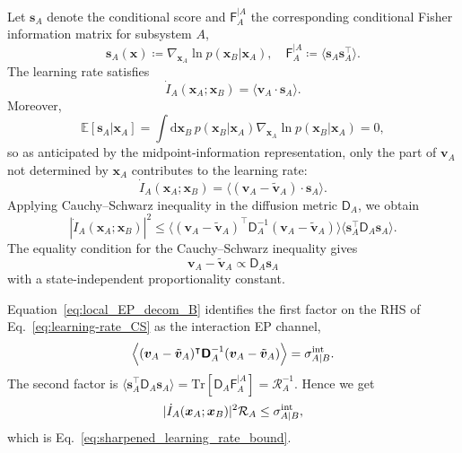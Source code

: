 \documentclass[
 longbibliography,
 twocolumn,
 superscriptaddress,
 amsmath,
 amssymb,
 amsthm,
 amsfonts,
 prl,
 floatfix,
]{revtex4-2}
\newcommand{\matbf}[1]{\boldsymbol{\mathsf{#1}}}
\begin{document}
Let $\bm s_A$ denote the conditional score and $\matbf F_A^{|A}$ the corresponding conditional Fisher information matrix for subsystem $A$,
\begin{equation*}
    \bm s_A(\bm x)\coloneq\nabla_{\bm x_A}\ln p(\bm x_B|\bm x_A),
    \quad
    \matbf F_A^{|A}\coloneq\langle\bm s_A\bm s_A^\intercal\rangle.
\end{equation*}
The learning rate satisfies~\cite{horowitz2014thermodynamics}
\begin{equation*}
    \dot I_A(\bm x_A;\bm x_B)=\langle\bm v_A\cdot\bm s_A\rangle.
\end{equation*}
Moreover,
\begin{equation*}
    \mathbb E[\bm s_A|\bm x_A]=\int\mathrm d\bm x_B\,p(\bm x_B|\bm x_A)\nabla_{\bm x_A}\ln p(\bm x_B|\bm x_A)=0,
\end{equation*}
so as anticipated by the midpoint-information representation, only the part of $\bm v_A$ not determined by $\bm x_A$ contributes to the learning rate:
\[
    \dot I_A(\bm x_A;\bm x_B)
    =\big\langle(\bm v_A-\tilde{\bm v}_A)\cdot\bm s_A\big\rangle.
\]
Applying Cauchy--Schwarz inequality in the diffusion metric $\matbf D_A$, we obtain
\begin{equation}
   \left|\dot I_A(\bm x_A;\bm x_B)\right|^2\leq
    \Big\langle(\bm v_A-\tilde{\bm v}_A)^\intercal\matbf D_A^{-1}(\bm v_A-\tilde{\bm v}_A)\Big\rangle
    \Big\langle\bm s_A^\intercal\matbf D_A\bm s_A\Big\rangle.
    \label{eq:learning-rate_CS}
\end{equation}
The equality condition for the Cauchy--Schwarz inequality gives
\begin{equation*}
    \bm v_A-\tilde{\bm v}_A
    \propto \matbf D_A\bm s_A
\end{equation*}
with a state-independent proportionality constant.

Equation~\eqref{eq:local_EP_decom_B} identifies the first factor on the RHS of Eq.~\eqref{eq:learning-rate_CS} as the interaction EP channel,
\begin{equation*}
    \Big\langle(\bm v_A-\tilde{\bm v}_A)^\intercal\matbf D_A^{-1}(\bm v_A-\tilde{\bm v}_A)\Big\rangle
    =\sigma_{A|B}^{\rm int}.
\end{equation*}
The second factor is $\big\langle\bm s_A^\intercal\matbf D_A\bm s_A\big\rangle
    =\mathrm{Tr}[\matbf D_A\matbf F_A^{|A}]
    =\mathcal R_A^{-1}$.
Hence we get
\[
    |\dot I_A(\bm x_A;\bm x_B)|^2\mathcal R_A
    \leq \sigma_{A|B}^{\rm int},
\]
which is Eq.~\eqref{eq:sharpened_learning_rate_bound}.
\end{document}
